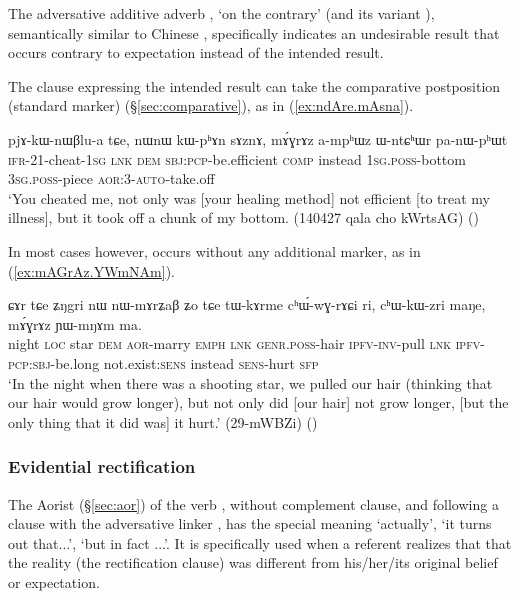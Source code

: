 The adversative additive adverb , `on the contrary' (and its variant ), semantically similar to Chinese , specifically indicates an undesirable result that occurs contrary to expectation instead of the intended result.

The clause expressing the intended result can take the comparative postposition (standard marker)  (§\ref{sec:comparative}), as in (\ref{ex:ndAre.mAsna}).

\begin{exe}
\ex \label{ex:sAznA.mAGrAZ}
\gll pjɤ-kɯ-nɯβlu-a tɕe, nɯnɯ kɯ-pʰɤn sɤznɤ, mɤ́ɣrɤz a-mpʰɯz ɯ-ntɕʰɯr pa-nɯ-pʰɯt \\
\textsc{ifr}-2\fl{}1-cheat-\textsc{1sg} \textsc{lnk} \textsc{dem} \textsc{sbj}:\textsc{pcp}-be.efficient \textsc{comp} instead \textsc{1sg}.\textsc{poss}-bottom \textsc{3sg}.\textsc{poss}-piece \textsc{aor}:3\flobv{}-\textsc{auto}-take.off \\
\glt `You cheated me, not only was [your healing method] not efficient [to treat my illness], but it took off a chunk of my bottom. (140427 qala cho kWrtsAG)
()
\end{exe} 

In most cases however,  occurs without any additional marker, as in (\ref{ex:mAGrAz.YWmNAm}).

\begin{exe}
\ex \label{ex:mAGrAz.YWmNAm}
\gll  ɕɤr tɕe ʑŋgri nɯ nɯ-mɤrʑaβ ʑo tɕe tɯ-kɤrme cʰɯ́-wɣ-rɤɕi ri, cʰɯ-kɯ-zri maŋe, mɤ́ɣrɤz ɲɯ-mŋɤm ma. \\
night \textsc{loc} star \textsc{dem} \textsc{aor}-marry \textsc{emph} \textsc{lnk} \textsc{genr}.\textsc{poss}-hair \textsc{ipfv}-\textsc{inv}-pull \textsc{lnk} \textsc{ipfv}-\textsc{pcp}:\textsc{sbj}-be.long not.exist:\textsc{sens} instead \textsc{sens}-hurt \textsc{sfp} \\
\glt `In the night when there was a shooting star, we pulled our hair (thinking that our hair would grow longer), but not only did [our hair] not grow longer, [but the only thing that it did was] it hurt.' (29-mWBZi)
()
\end{exe} 

 \subsubsection{Evidential rectification} \label{sec:evd.rectification.clauses}
 The Aorist  (§\ref{sec:aor}) of the verb ,  without complement clause, and following a clause with the adversative linker , has the special meaning `actually', `it turns out that...', `but in fact ...'. It is specifically used when a referent realizes that that the reality (the rectification clause) was different from his/her/its original belief or expectation. 

